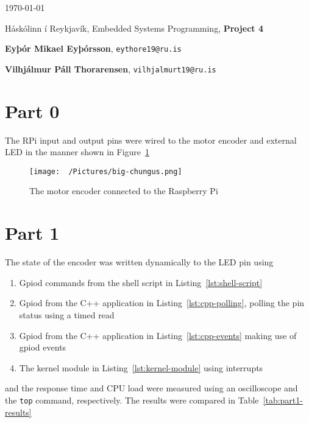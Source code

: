 \documentclass{article}
\begin{document}
\today \par
\vspace{.5cm}
\noindent Háskólinn í Reykjavík, Embedded Systems Programming, \textbf{Project 4} \par
\noindent \textbf{Eyþór Mikael Eyþórsson}, \texttt{eythore19@ru.is}\par
\noindent \textbf{Vilhjálmur Páll Thorarensen}, \texttt{vilhjalmurt19@ru.is}\par

\section*{Part 0}
The RPi input and output pins were wired to the motor encoder and external LED 
in the manner shown in Figure~\ref{fig:rpi-encoder-connection}
\begin{figure}[h]
	\begin{center}
		\texttt{[image: ~/Pictures/big-chungus.png]}
	\end{center}
	\caption{The motor encoder connected to the Raspberry
		Pi}\label{fig:rpi-encoder-connection}
\end{figure}

\section*{Part 1}

The state of the encoder was written dynamically to the LED pin using \begin{enumerate}
    \item Gpiod commands from the shell script in Listing~\ref{lst:shell-script}
    \item Gpiod from the C++ application in Listing~\ref{lst:cpp-polling}, polling the pin status using a timed read
    \item Gpiod from the C++ application in Listing~\ref{lst:cpp-events} making use of gpiod events 
    \item The kernel module in Listing~\ref{lst:kernel-module} using interrupts
\end{enumerate} and the response time and CPU load were measured using an oscilloscope and
the \texttt{top} command, respectively. The results were compared in
Table~\ref{tab:part1-results} 
\end{document}
